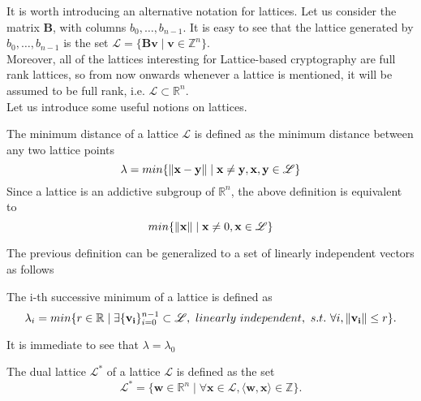 It is worth introducing an alternative notation for lattices. Let us consider the matrix $\mathbf{B}$, with columns $b_0,\ldots,b_{n-1}$. It is easy to see that the lattice generated by $b_0,\ldots,b_{n-1}$ is the set $\mathscr{L}=\{\mathbf{Bv}\mid\mathbf{v}\in\mathbb{Z}^n\}$.\\
Moreover, all of the lattices interesting for Lattice-based cryptography are full rank lattices, so from now onwards whenever a lattice is mentioned, it will be assumed to be full rank, i.e. $\mathscr{L}\subset\mathbb{R}^n$.\\
Let us introduce some useful notions on lattices.

\begin{definition}
The minimum distance of a lattice $\mathscr{L}$ is defined as the minimum distance between any two lattice points
\begin{equation*}
\lambda = min\{\left\lVert \mathbf{x}-\mathbf{y} \right\rVert\mid\mathbf{x}\ne \mathbf{y}, \mathbf{x},\mathbf{y}\in\mathscr{L}\}
\end{equation*}
Since a lattice is an addictive subgroup of $\mathbb{R}^n$, the above definition is equivalent to
\begin{equation*}
min\{\left\lVert \mathbf{x} \right\rVert\mid\mathbf{x}\ne0, \mathbf{x}\in\mathscr{L}\}
\end{equation*}
\end{definition}

The previous definition can be generalized to a set of linearly independent vectors as follows
\begin{definition}
The i-th successive minimum of a lattice is defined as 
\begin{equation*}
\lambda_i = min\{r \in \mathbb{R}\mid\exists \{\mathbf{v_i}\}_{i=0}^{n-1} \subset \mathscr{L},\text{ }linearly\text{ }independent,\text{ }s.t.\text{ }\forall i,\left\lVert \mathbf{v_i} \right\rVert\leq r\}.
\end{equation*}
\end{definition}

\begin{remark}
It is immediate to see that $\lambda=\lambda_0$
\end{remark}

\begin{definition}
The dual lattice $\mathscr{L}^*$ of a lattice $\mathscr{L}$ is defined as the set
\begin{equation*}
\mathscr{L}^*=\{\mathbf{w}\in\mathbb{R}^n\mid\forall\mathbf{x}\in\mathscr{L},\langle\mathbf{w},\mathbf{x}\rangle\in\mathbb{Z}\}.
\end{equation*}
\end{definition} 

